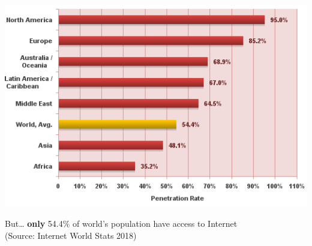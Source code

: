 \documentclass[notitlepage, usenames,dvipsnames]{beamer}
\begin{document}
\begin{frame}
\begin{overlayarea}{\textwidth}{0.9\textheight}
         {
            \vspace{0.5ex}
            \centering\includegraphics[scale=0.45]{../img/internet-penetration.png}

            \vspace{-0.5ex}
            \begin{alertblock}{But\ldots}
                \textbf{only} {\Large 54.4\%} of world's population have access to Internet\\
                {\footnotesize (Source: Internet World Stats 2018)}
            \end{alertblock}
        }

    \end{overlayarea}
    \end{frame}
\end{document}
